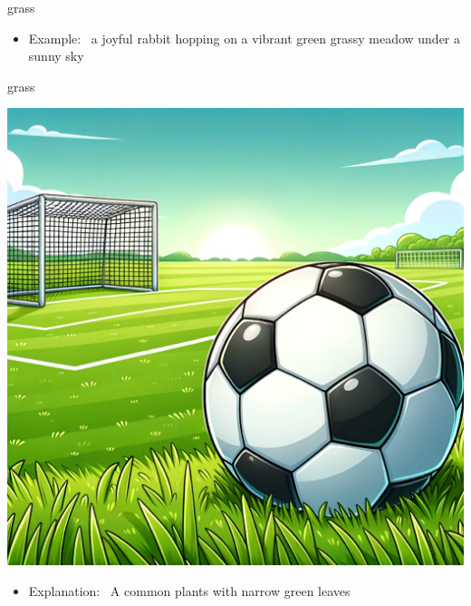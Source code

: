\documentclass[avery5371, grid,frame]{flashcards}
\begin{document}
\begin{flashcard}{grass}
\begin{center}
\begin{minipage}[c]{.45\textwidth}
\begin{itemize}
            \item Example: \ a joyful rabbit hopping on a vibrant green grassy meadow under a sunny sky
            \end{itemize}
        \end{minipage}
    \end{center}
    \vspace*{\fill}
\end{flashcard}\begin{flashcard}{grass}
    \vspace*{\fill}
    \begin{center}
        \begin{minipage}[c]{.45\textwidth}
            \includegraphics[width=\textwidth]{cards/g/grass/grass - a soccer ball on a grass pitch with goalposts in the distance, ready for a game.png}
        \end{minipage}
        \begin{minipage}[c]{.45\textwidth}
            \begin{itemize}\setlength\itemsep{12pt}
            \item Explanation: \ A common plants with narrow green leaves


\end{itemize}
\end{minipage}
\end{center}
\end{flashcard}
\end{document}

